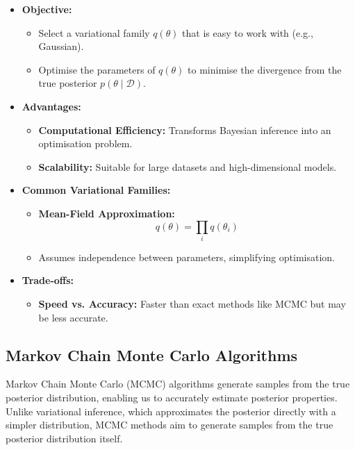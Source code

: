 \begin{itemize}
    \item \textbf{Objective:}
    \begin{itemize}
        \item Select a variational family $q(\theta)$ that is easy to work with (e.g., Gaussian).
        \item Optimise the parameters of $q(\theta)$ to minimise the divergence from the true posterior $p(\theta \mid \mathcal{D})$.
    \end{itemize}
    \item \textbf{Advantages:}
    \begin{itemize}
        \item \textbf{Computational Efficiency:} Transforms Bayesian inference into an optimisation problem.
        \item \textbf{Scalability:} Suitable for large datasets and high-dimensional models.
    \end{itemize}
    \item \textbf{Common Variational Families:}
    \begin{itemize}
        \item \textbf{Mean-Field Approximation:}
        \[
        q(\theta) = \prod_i q(\theta_i)
        \]
        \item Assumes independence between parameters, simplifying optimisation.
    \end{itemize}
    \item \textbf{Trade-offs:}
    \begin{itemize}
        \item \textbf{Speed vs. Accuracy:} Faster than exact methods like MCMC but may be less accurate.
    \end{itemize}
\end{itemize}

\subsection{Markov Chain Monte Carlo Algorithms}

Markov Chain Monte Carlo (MCMC) algorithms generate samples from the true posterior distribution, enabling us to accurately estimate posterior properties. Unlike variational inference, which approximates the posterior directly with a simpler distribution, MCMC methods aim to generate samples from the true posterior distribution itself.

